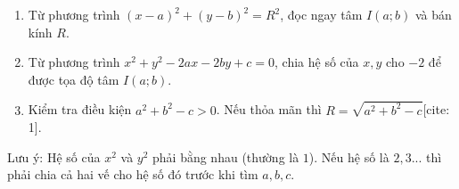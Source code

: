 \begin{enumerate}
\item Từ phương trình $(x-a)^2 + (y-b)^2 = R^2$, đọc ngay tâm $I(a; b)$ và bán kính $R$.
\item Từ phương trình $x^2 + y^2 - 2ax - 2by + c = 0$, chia hệ số của $x, y$ cho $-2$ để được tọa độ tâm $I(a; b)$.
\item Kiểm tra điều kiện $a^2 + b^2 - c > 0$. Nếu thỏa mãn thì $R = \sqrt{a^2 + b^2 - c}$[cite: 1].
\end{enumerate}
Lưu ý: Hệ số của $x^2$ và $y^2$ phải bằng nhau (thường là $1$). Nếu hệ số là $2, 3...$ thì phải chia cả hai vế cho hệ số đó trước khi tìm $a, b, c$.
